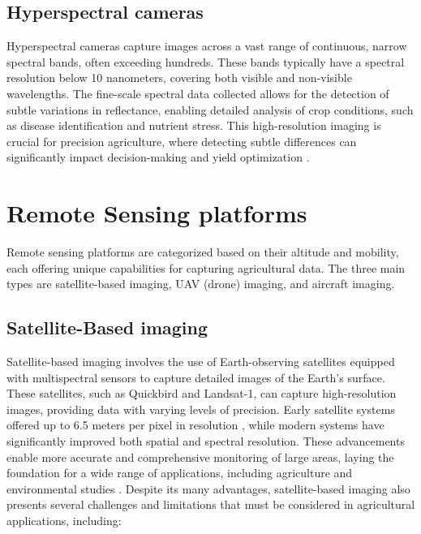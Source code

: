 \subsection{Hyperspectral cameras}
Hyperspectral cameras capture images across a vast range of continuous, narrow spectral bands, often exceeding hundreds. These bands typically have a spectral resolution below 10 nanometers, covering both visible and non-visible wavelengths. The fine-scale spectral data collected allows for the detection of subtle variations in reflectance, enabling detailed analysis of crop conditions, such as disease identification and nutrient stress. This high-resolution imaging is crucial for precision agriculture, where detecting subtle differences can significantly impact decision-making and yield optimization \parencite{delavarpour2021technical} \parencite{lu2020recent}.

\section{Remote Sensing platforms}
Remote sensing platforms are categorized based on their altitude and mobility, each offering unique capabilities for capturing agricultural data. The three main types are satellite-based imaging, UAV (drone) imaging, and aircraft imaging.

\subsection{Satellite-Based imaging}
Satellite-based imaging involves the use of Earth-observing satellites equipped with multispectral sensors to capture detailed images of the Earth's surface. These satellites, such as Quickbird and Landsat-1, can capture high-resolution images, providing data with varying levels of precision. Early satellite systems offered up to 6.5 meters per pixel in resolution \parencite{phang2023satellite}, while modern systems have significantly improved both spatial and spectral resolution. These advancements enable more accurate and comprehensive monitoring of large areas, laying the foundation for a wide range of applications, including agriculture and environmental studies \parencite{adao2017hyperspectral}. Despite its many advantages, satellite-based imaging also presents several challenges and limitations that must be considered in agricultural applications, including:

